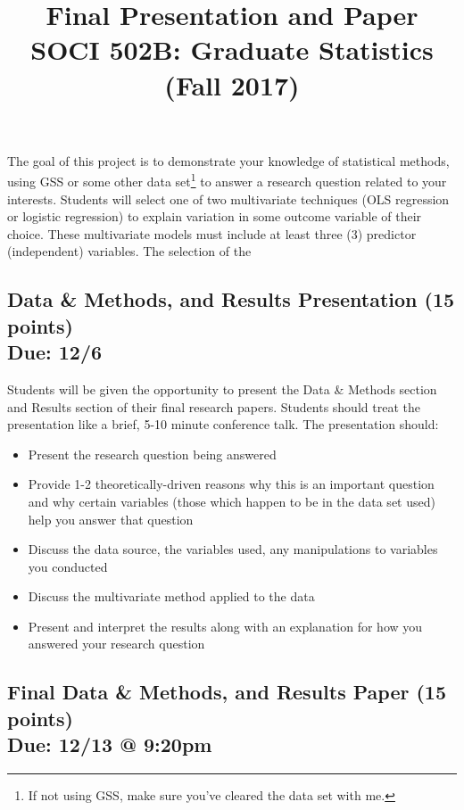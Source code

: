 \documentclass{article}
\begin{document}
\title{Final Presentation and Paper\\ SOCI 502B: Graduate Statistics (Fall 2017)}
\author[*]{}
\date{}
\maketitle

The goal of this project is to demonstrate your knowledge of statistical methods, using GSS or some other data set\footnote{If not using GSS, make sure you've cleared the data set with me.} to answer a research question related to your interests. Students will select one of two multivariate techniques (OLS regression or logistic regression) to explain variation in some outcome variable of their choice. These multivariate models must include at least three (3) predictor (independent) variables. The selection of the \newline 

\begin{centering}
\section*{Data \& Methods, and Results Presentation (15 points)\\Due: 12/6}
\end{centering}

Students will be given the opportunity to present the Data \& Methods section and Results section of their final research papers. Students should treat the presentation like a brief, 5-10 minute conference talk. The presentation should: \\

\begin{itemize}
\item Present the research question being answered
\item Provide 1-2 theoretically-driven reasons why this is an important question and why certain variables (those which happen to be in the data set used) help you answer that question
\item Discuss the data source, the variables used, any manipulations to variables you conducted
\item Discuss the multivariate method applied to the data
\item Present and interpret the results along with an explanation for how you answered your research question
\end{itemize}

\begin{centering}
\section*{Final Data \& Methods, and Results Paper (15 points)\\Due: 12/13 @ 9:20pm}
\end{centering}
\end{document}
